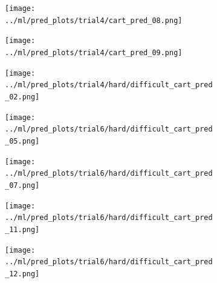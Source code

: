 \documentclass{beamer}
\newcommand{\mybox}[3]{{\color{#1}\framebox{\color{#2}#3}}}
\begin{document}
\begin{frame}{\mybox{green}{blue}{Test Results}}
\begin{figure}[h!]
            \hfill
            \centering
            \begin{subfigure}[t]{0.2\textwidth}
                \centering
                \texttt{[image: ../ml/pred\_plots/trial4/cart\_pred\_08.png]}
            \end{subfigure}%
            \hfill
            \begin{subfigure}[t]{0.2\textwidth}
                \centering
                \texttt{[image: ../ml/pred\_plots/trial4/cart\_pred\_09.png]}
            \end{subfigure}
            \vfill
            \begin{subfigure}[t]{0.2\textwidth}
                \centering
                \texttt{[image: ../ml/pred\_plots/trial4/hard/difficult\_cart\_pred\_02.png]}
            \end{subfigure}%
            \hfill
            \centering
            \begin{subfigure}[t]{0.2\textwidth}
                \centering
                \texttt{[image: ../ml/pred\_plots/trial6/hard/difficult\_cart\_pred\_05.png]}
            \end{subfigure}%
            \hfill
            \centering
            \begin{subfigure}[t]{0.2\textwidth}
                \centering
                \texttt{[image: ../ml/pred\_plots/trial6/hard/difficult\_cart\_pred\_07.png]}
            \end{subfigure}%
            \hfill
            \centering
            \begin{subfigure}[t]{0.2\textwidth}
                \centering
                \texttt{[image: ../ml/pred\_plots/trial6/hard/difficult\_cart\_pred\_11.png]}
            \end{subfigure}%
            \hfill
            \begin{subfigure}[t]{0.2\textwidth}
                \centering
                \texttt{[image: ../ml/pred\_plots/trial6/hard/difficult\_cart\_pred\_12.png]}
            \end{subfigure}
        \end{figure}
    \end{frame}
\end{document}
